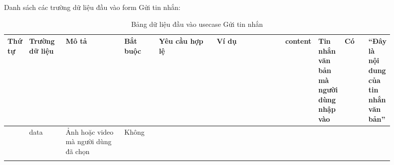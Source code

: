 \documentclass[../DoAn.tex]{subfiles}
\begin{document}
Danh sách các trường dữ liệu đầu vào form Gửi tin nhắn:
\begin{longtable}[c]{
|>{\raggedright\arraybackslash}m{0.05\linewidth}
|>{\raggedright\arraybackslash}m{0.1\linewidth}
|>{\raggedright\arraybackslash}m{0.2\linewidth}
|>{\raggedright\arraybackslash}m{0.1\linewidth}
|>{\raggedright\arraybackslash}m{0.2\linewidth}
|>{\raggedright\arraybackslash}m{0.25\linewidth}|}
\hline
\textbf{Thứ tự} & \textbf{Trường dữ liệu} & \textbf{Mô tả} & \textbf{Bắt buộc} & \textbf{Yêu cầu hợp lệ} & \textbf{Ví dụ} \hline
{} & content & Tin nhắn văn bản mà người dùng nhập vào & Có & & “Đây là nội dung của tin nhắn văn bản” \\  & data & Ảnh hoặc video mà người dùng đã chọn & Không & & \\ \hline
\caption{Bảng dữ liệu đầu vào usecase Gửi tin nhắn}
\label{tab:use_case_tổng_quan}
\end{longtable}

\newpage
\end{document}
